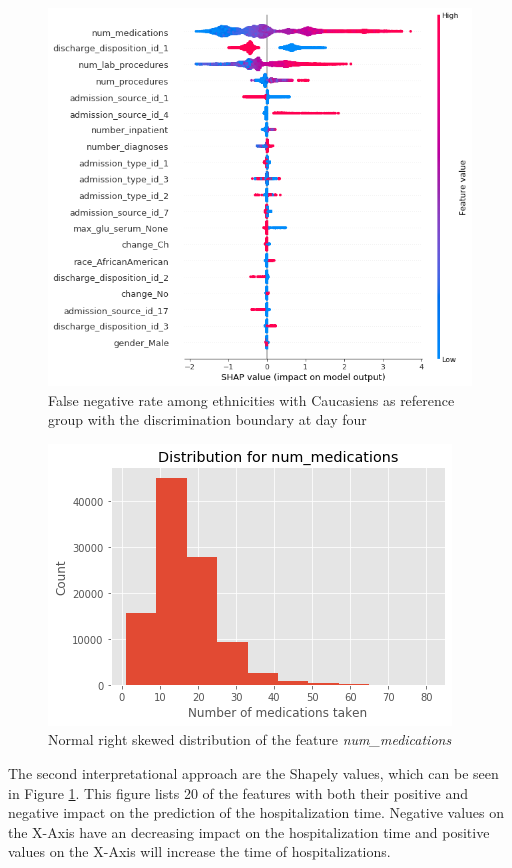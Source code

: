 \documentclass[journal]{IEEEtran}
\begin{document}
\begin{figure}
	\centering
	\includegraphics[width=1\linewidth]{../imgs/shap_paper}
	\caption{False negative rate among ethnicities with Caucasiens as reference group with the discrimination boundary at day four}
	\label{fig:shap}
\end{figure}

\begin{figure}
	\centering
	\includegraphics[width=0.9\linewidth]{../imgs/meds_dist}
	\caption{Normal right skewed distribution of the feature \textit{num\_medications}}
	\label{fig:num_meds}
\end{figure}

The second interpretational approach are the Shapely values, which can be seen in Figure \ref{fig:shap}. This figure lists 20 of the features with both their positive and negative impact on the prediction of the hospitalization time. Negative values on the X-Axis have an decreasing impact on the hospitalization time and positive values on the X-Axis will increase the time of hospitalizations.
\end{document}
